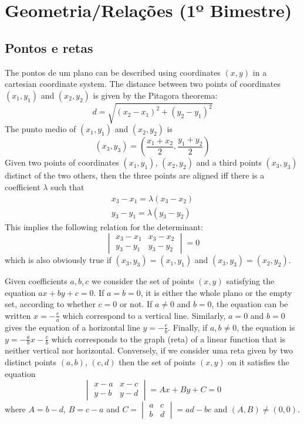 \chapter{Geometria/Relações (1º Bimestre)}

\section{Pontos e retas}

The pontos de um plano can be described using coordinates $(x,y)$ in a cartesian
coordinate system. The distance between two points of coordinates
$(x_1,y_1)$ and $(x_2,y_2)$ is given by the Pitagora theorema:
$$d = \sqrt{{(x_2-x_1)}^2 + {(y_2-y_1)}^2}$$
The punto medio of $(x_1,y_1)$ and $(x_2,y_2)$ is
$$
(x_3,y_3) = \left(\frac{x_1+x_2}{2}, \frac{y_1+y_2}{2}\right)
$$
Given  two points of coordinates $(x_1,y_1)$, $(x_2,y_2)$ and a third
points $(x_3,y_3)$ distinct of the two others, then the three points are
aligned iff there is a coefficient $\lambda$ such that
$$
\begin{gathered}
x_3 - x_1 = \lambda\left(x_3-x_2\right) \\
y_3 - y_1 = \lambda\left(y_3-y_2\right)
\end{gathered}
$$
This implies the following relation for the determinant:
$$
\begin{vmatrix}
x_3 - x_1 & x_3-x_2 \\
y_3 - y_1 & y_3-y_2
\end{vmatrix} = 0
$$
which is also obviously true if $(x_3,y_3) = (x_1,y_1)$ and
$(x_3,y_3) = (x_2,y_2)$.

Given coefficients $a,b,c$ we consider the set of points $(x,y)$ satisfying
the equation $ax + by + c = 0$. If $a=b=0$, it is either the whole plano
or the empty set, according to whether $c = 0$ or not. If $a \neq 0$ and
$b = 0$, the equation can be written $x = -\frac{c}{a}$ which correspond to
a vertical line. Similarly, $a=0$ and $b=0$ gives the equation of a
horizontal line $y = -\frac{c}{b}$. Finally, if $a, b \neq 0$, the equation is
$y = -\frac{a}{b} x - \frac{c}{b}$
which corresponds to the graph (reta) of a linear function that is neither
vertical nor horizontal.
Conversely, if we consider uma reta given by two distinct points
$(a,b)$, $(c,d)$ then the set of points $(x,y)$ on it satisfies the equation
$$
\begin{vmatrix}
x - a & x-c \\
y - b & y-d
\end{vmatrix} = Ax + By + C = 0
$$
where $A = b-d$, $B = c-a$ and $C = \begin{vmatrix}
a & c \\
b & d
\end{vmatrix} = ad-bc$ and $(A,B) \neq (0,0)$.

